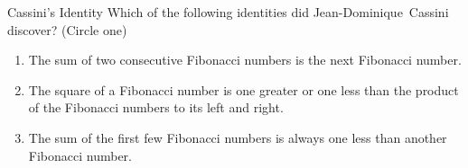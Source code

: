 \documentclass[12pt,letterpaper]{article}
\makeatletter
\newenvironment{problem}{\@startsection
       {section}
       {1}
       {-.2em}
       {-3.5ex plus -1ex minus -.2ex}
       {2.3ex plus .2ex}
       {\pagebreak[3]
       \large\bf\noindent{Problem }
       }
       }
\makeatother
\begin{document}
\begin{problem}{Cassini's Identity}
 Which of the following identities did Jean-Dominique~Cassini discover? (Circle one)
 
 \begin{enumerate}[\hspace{1em}a)]
  \item The sum of two consecutive Fibonacci numbers is the next Fibonacci number.
  \item The square of a Fibonacci number is one greater or one less than the product of the Fibonacci numbers to its left
  and right.
  \item The sum of the first few Fibonacci numbers is always one less than another Fibonacci number.
 \end{enumerate}
\end{problem}
\end{document}

